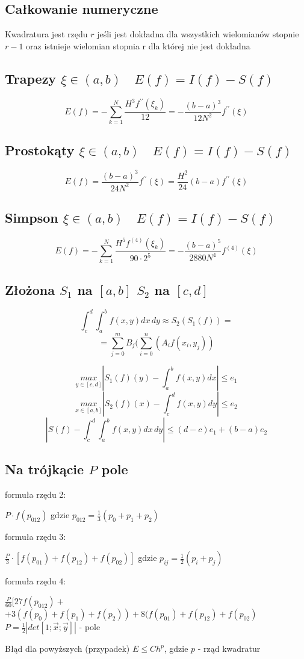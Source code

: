 \documentclass[twocolumn]{article}
\begin{document}
\begin{flushleft}
\thispagestyle{empty} %

\section{Całkowanie numeryczne}
Kwadratura jest rzędu $r$ jeśli jest dokładna dla wszystkich wielomianów stopnie $r-1$ oraz istnieje wielomian stopnia r dla której nie jest dokładna\\
\subsection{Trapezy $\xi \in \left(a,b\right) \quad E(f) = I(f) - S(f)$}
$$E(f) = -\sum_{k=1}^{N}\frac{H^3f^{\prime\prime}(\xi_k)}{12} =- \frac{(b-a)^3}{12N^2}f^{\prime\prime}(\xi)$$
\subsection{Prostokąty $\xi \in \left(a,b\right) \quad E(f) = I(f) - S(f)$}
$$E(f) = \frac{(b-a)^3}{24N^2}f^{\prime\prime}(\xi) = \frac{H^2}{24}(b-a) f^{\prime\prime}(\xi)$$
\subsection{Simpson $\xi \in \left(a,b\right) \quad E(f) = I(f) - S(f)$}
$$E(f)= -\sum_{k=1}^N \frac{H^5f^{(4)}(\xi_k)}{90\cdot2^5} =- \frac{(b-a)^5}{2880N^4}f^{(4)}(\xi) $$%
\subsection{Złożona $S_1$ na $[a,b]$ $S_2$ na $[c,d]$}
$$\int_c^d\int_a^b f(x,y) dx\, dy \approx S_2(S_1(f)) =$$
$$=\sum_{j=0}^m B_j (\sum_{i=0}^n(A_i f(x_i,y_j))$$

$$\underset{y\in[c,d]}{max} \left| S_1(f)(y) - \int_a^bf(x,y)dx \right| \leq e_1$$
$$\underset{x\in[a,b]}{max} \left| S_2(f)(x) - \int_c^df(x,y)dy \right| \leq e_2$$
$$\left| S(f) - \int_c^d\int_a^b f(x,y) dx \,dy \right| \leq (d-c) e_1 + (b-a) e_2$$
\subsection{Na trójkącie $P$ pole}
formuła rzędu 2:
\begin{center}
$P\cdot f(p_{012})$ gdzie $p_{012} = \frac{1}{3}(p_0+p_1+p_2)$
\end{center}
formuła rzędu 3:
\begin{center}
$\frac{P}{3}\cdot \left[f(p_{01})+f(p_{12})+f(p_{02})\right]$ gdzie $p_{ij} = \frac{1}{2}(p_i+p_j)$
\end{center}
formuła rzędu 4:
\begin{center}
$\frac{P}{60}[ 27f(p_{012})+$\\$ + 3(f(p_0)+f(p_1)+f(p_2)) + 8(f(p_{01})+f(p_{12})+f(p_{02})$\\
\vspace{2mm}
$P = \frac{1}{2}|det[1;\overrightarrow{x};\overrightarrow{y}]|$ - pole
\end{center}
Błąd dla powyższych (przypadek) $E \leq Ch^p$, gdzie $p$ - rząd kwadratur


\end{flushleft}
\end{document}
